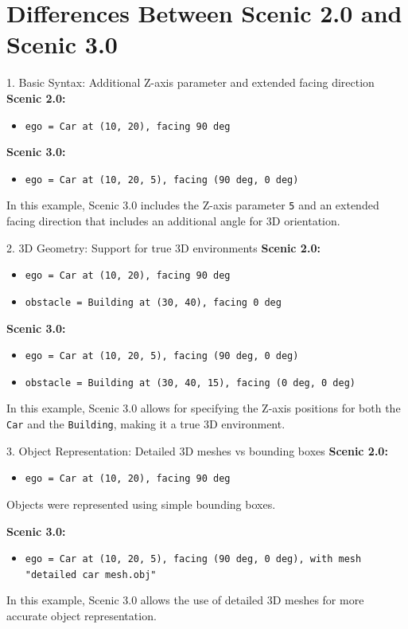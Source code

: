 \documentclass[10pt]{beamer}
\begin{document}
\section{Differences Between Scenic 2.0 and Scenic 3.0}

\begin{frame}{1. Basic Syntax: Additional Z-axis parameter and extended facing direction}
\textbf{Scenic 2.0:}
\begin{itemize}
    \item \texttt{ego = Car at (10, 20), facing 90 deg}
\end{itemize}

\textbf{Scenic 3.0:}
\begin{itemize}
    \item \texttt{ego = Car at (10, 20, 5), facing (90 deg, 0 deg)}
\end{itemize}

In this example, Scenic 3.0 includes the Z-axis parameter \texttt{5} and an extended facing direction that includes an additional angle for 3D orientation.
\end{frame}

\begin{frame}{2. 3D Geometry: Support for true 3D environments}
\textbf{Scenic 2.0:}
\begin{itemize}
    \item \texttt{ego = Car at (10, 20), facing 90 deg}
    \item \texttt{obstacle = Building at (30, 40), facing 0 deg}
\end{itemize}

\textbf{Scenic 3.0:}
\begin{itemize}
    \item \texttt{ego = Car at (10, 20, 5), facing (90 deg, 0 deg)}
    \item \texttt{obstacle = Building at (30, 40, 15), facing (0 deg, 0 deg)}
\end{itemize}

In this example, Scenic 3.0 allows for specifying the Z-axis positions for both the \texttt{Car} and the \texttt{Building}, making it a true 3D environment.
\end{frame}

\begin{frame}{3. Object Representation: Detailed 3D meshes vs bounding boxes}
\textbf{Scenic 2.0:}
\begin{itemize}
    \item \texttt{ego = Car at (10, 20), facing 90 deg}
\end{itemize}

Objects were represented using simple bounding boxes.

\textbf{Scenic 3.0:}
\begin{itemize}
    \item \texttt{ego = Car at (10, 20, 5), facing (90 deg, 0 deg), with mesh "detailed car mesh.obj"}
\end{itemize}

In this example, Scenic 3.0 allows the use of detailed 3D meshes for more accurate object representation.
\end{frame}
\end{document}
